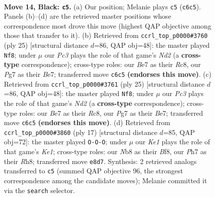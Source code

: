 \documentclass[11pt]{article}
\begin{document}
\clearpage

\begin{figure}[p]\centering
\begin{subfigure}{0.46\textwidth}\centering
\resizebox{\linewidth}{!}{%
\newchessgame
\chessboard[
  setfen={rnb1kr2/p3b1pp/1ppq1n2/3p1p2/3P3P/PP2PNPB/4QP2/RNB1R1K1 b - - 0 14},
  showmover=false,
  pgfstyle=straightmove, color=movearrow, markmove={c6-c5}
]}
\caption{}
\end{subfigure}\hfill
\begin{subfigure}{0.46\textwidth}\centering
\resizebox{\linewidth}{!}{%
\newchessgame
\chessboard[
  setfen={2r1k2r/1bqnbppp/pp1p1n2/4p3/P3P3/2N3P1/1PPNQPBP/R1BR2K1 b k - 9 13},
  showmover=false,
  pgfstyle=straightmove, color=movearrow, markmove={d7-f8}
]}
\caption{}
\end{subfigure}
\\[4pt]
\begin{subfigure}{0.46\textwidth}\centering
\resizebox{\linewidth}{!}{%
\newchessgame
\chessboard[
  setfen={2r1k2r/1bqnbppp/pp1p1n2/4p3/P3P3/2N3P1/1PPNQPBP/R1BR2K1 b k - 9 13},
  showmover=false,
  pgfstyle=straightmove, color=movearrow, markmove={d7-f8}
]}
\caption{}
\end{subfigure}\hfill
\begin{subfigure}{0.46\textwidth}\centering
\resizebox{\linewidth}{!}{%
\newchessgame
\chessboard[
  setfen={r3kb1r/pbpqnppp/1pn1p3/4P3/2BP4/P1N1BN2/1P3PPP/R2QK2R b KQkq - 0 9},
  showmover=false,
  pgfstyle=straightmove, color=movearrow, markmove={e8-c8}
]}
\caption{}
\end{subfigure}
\caption{\textbf{Move 14, Black: \texttt{c5}.} (a) Our position; Melanie plays \texttt{c5} (\texttt{c6c5}). Panels (b)--(d) are the retrieved master positions whose correspondence most drove this move (highest QAP objective among those that transfer to it). (b) Retrieved from \texttt{ccrl\_top\_p0000\#3760} (ply 25) [structural distance $d$=86, QAP obj=48]: the master played \texttt{Nf8}; under $\mu$ our \emph{Pc3} plays the role of that game's \emph{Nd2} (a \textbf{cross-type} correspondence); cross-type roles: our \emph{B}e7 as their \emph{R}c8, our \emph{P}g7 as their \emph{B}e7; transferred move \texttt{c6c5} \textbf{(endorses this move)}. (c) Retrieved from \texttt{ccrl\_top\_p0000\#3761} (ply 25) [structural distance $d$=86, QAP obj=48]: the master played \texttt{Nf8}; under $\mu$ our \emph{Pc3} plays the role of that game's \emph{Nd2} (a \textbf{cross-type} correspondence); cross-type roles: our \emph{B}e7 as their \emph{R}c8, our \emph{P}g7 as their \emph{B}e7; transferred move \texttt{c6c5} \textbf{(endorses this move)}. (d) Retrieved from \texttt{ccrl\_top\_p0000\#3860} (ply 17) [structural distance $d$=85, QAP obj=72]: the master played \texttt{O-O-O}; under $\mu$ our \emph{Ke1} plays the role of that game's \emph{Ke1}; cross-type roles: our \emph{N}b8 as their \emph{B}f8, our \emph{P}h7 as their \emph{R}h8; transferred move \texttt{e8d7}. Synthesis: 2 retrieved analogs transferred to \texttt{c5} (summed QAP objective 96, the strongest correspondence among the candidate moves); Melanie committed it via the \texttt{search} selector.}
\label{fig:thought-m27}
\end{figure}
\end{document}
